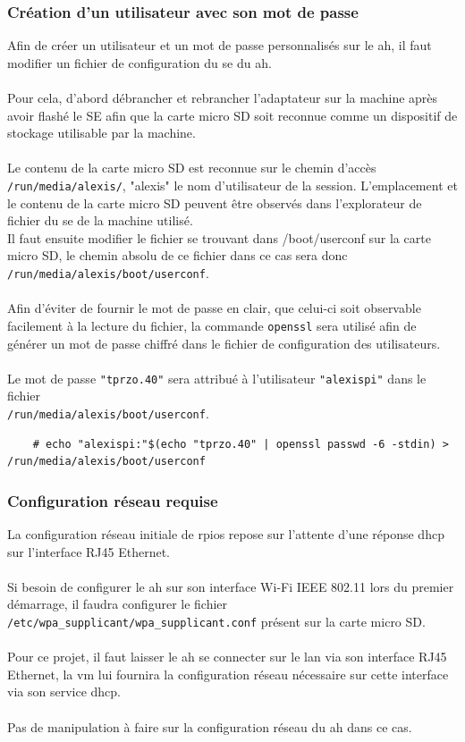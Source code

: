 \documentclass[a4paper]{article}
\begin{document}
\subsubsection{Création d'un utilisateur avec son mot de passe}
\label{sec:sec03}
Afin de créer un utilisateur et un mot de passe personnalisés sur le \acrshort{ah}, il faut modifier un fichier de configuration du \acrshort{se} du \acrshort{ah}.\\\\Pour cela, d'abord débrancher et rebrancher l'adaptateur sur la machine après avoir flashé le SE afin que la carte micro SD soit reconnue comme un dispositif de stockage utilisable par la machine.\\\\Le contenu de la carte micro SD est reconnue sur le chemin d'accès \verb|/run/media/alexis/|, "alexis" le nom d'utilisateur de la session. L'emplacement et le contenu de la carte micro SD peuvent être observés dans l'explorateur de fichier du \acrshort{se} de la machine utilisé.\\Il faut ensuite modifier le fichier se trouvant dans /boot/userconf sur la carte micro SD, le chemin absolu de ce fichier dans ce cas sera donc \verb|/run/media/alexis/boot/userconf|.\\\\Afin d'éviter de fournir le mot de passe en clair, que celui-ci soit observable facilement à la lecture du fichier, la commande \verb|openssl| sera utilisé afin de générer un mot de passe chiffré dans le fichier de configuration des utilisateurs.\\\\Le mot de passe \verb|"tprzo.40"| sera attribué à l'utilisateur \verb|"alexispi"| dans le fichier\\\verb|/run/media/alexis/boot/userconf|.
\begin{lstlisting}
    # echo "alexispi:"$(echo "tprzo.40" | openssl passwd -6 -stdin) > /run/media/alexis/boot/userconf
\end{lstlisting}
\subsubsection{Configuration réseau requise}
La configuration réseau initiale de \gls{rpios} repose sur l'attente d'une réponse \gls{dhcp} sur l'interface RJ45 Ethernet.\\\\Si besoin de configurer le \acrshort{ah} sur son interface Wi-Fi IEEE 802.11 lors du premier démarrage, il faudra configurer le fichier \verb|/etc/wpa_supplicant/wpa_supplicant.conf| présent sur la carte micro SD.\\\\Pour ce projet, il faut laisser le \acrshort{ah} se connecter sur le \gls{lan} via son interface RJ45 Ethernet, la \acrshort{vm} lui fournira la configuration réseau nécessaire sur cette interface via son service \gls{dhcp}.\\\\Pas de manipulation à faire sur la configuration réseau du \acrshort{ah} dans ce cas.
\end{document}
